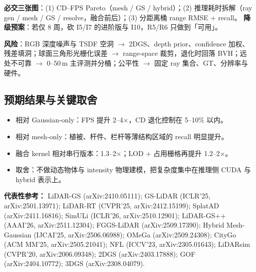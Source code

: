 \documentclass[10pt,a4paper]{article}
\begin{document}
\textbf{必交三张图}：(1) CD--FPS Pareto（mesh / GS / hybrid）；(2) 推理耗时拆解（ray gen / mesh / GS / resolve，融合前后）；(3) 分距离桶 range RMSE + recall。
\textbf{降级预案}：若仅 8 周，砍 I5/I7 的进阶版与 I10，R5/R6 只做到「可用」。

\vspace{2pt}
{\scriptsize\color{cgray}
\textbf{风险}：RGB 深度噪声与 TSDF 空洞 $\rightarrow$ 2DGS、depth prior、confidence 加权、残差填洞；球面三角形光栅化误差 $\rightarrow$ range-space 裁剪，退化时回落 BVH；远处不可靠 $\rightarrow$ 0--50\,m 主评测并分桶；公平性 $\rightarrow$ 固定 ray 集合、GT、分辨率与硬件。}

\subsection*{预期结果与关键取舍}
\begin{itemize}
\item 相对 Gaussian-only：FPS 提升 2--4$\times$，CD 退化控制在 5--10\% 以内。
\item 相对 mesh-only：植被、杆件、栏杆等薄结构区域的 recall 明显提升。
\item 融合 kernel 相对串行版本：1.3--2$\times$；LOD + 占用栅格再提升 1.2--2$\times$。
\item 取舍：不做动态物体与 intensity 物理建模，把复杂度集中在推理侧 CUDA 与 hybrid 表示上。
\end{itemize}

\vspace{3pt}
\begin{sloppypar}
{\scriptsize
\textbf{代表性参考：}
LiDAR-GS (arXiv:2410.05111); GS-LiDAR (ICLR'25, arXiv:2501.13971); LiDAR-RT (CVPR'25, arXiv:2412.15199);
SplatAD (arXiv:2411.16816); SimULi (ICLR'26, arXiv:2510.12901); LiDAR-GS++ (AAAI'26, arXiv:2511.12304);
FGGS-LiDAR (arXiv:2509.17390); Hybrid Mesh-Gaussian (IJCAI'25, arXiv:2506.06988); OMeGa (arXiv:2509.24308);
CityGo (ACM MM'25, arXiv:2505.21041); NFL (ICCV'23, arXiv:2305.01643); LiDARsim (CVPR'20, arXiv:2006.09348);
2DGS (arXiv:2403.17888); GOF (arXiv:2404.10772); 3DGS (arXiv:2308.04079).
}
\end{sloppypar}
\end{document}
